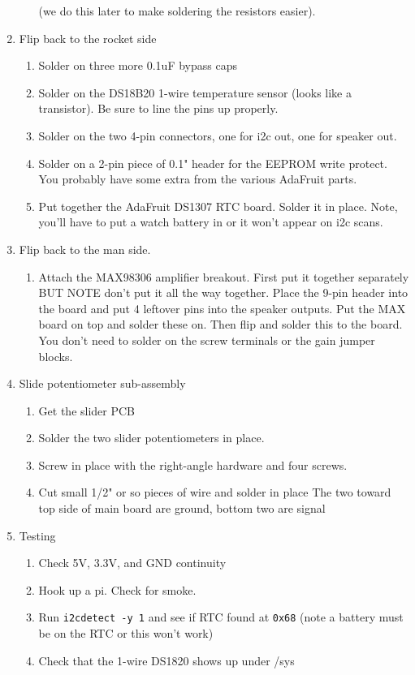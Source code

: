 \documentclass[11pt]{article}
\begin{document}
\begin{enumerate}
\begin{enumerate}
			(we do this later to make soldering the resistors easier).
	\end{enumerate}
\item	Flip back to the rocket side
	\begin{enumerate}
		\item Solder on three more 0.1uF bypass caps
		\item Solder on the DS18B20 1-wire temperature sensor (looks like
			a transistor).
                      Be sure to line the pins up properly.
		\item Solder on the two 4-pin connectors, one for i2c out, one for
			speaker out.
		\item Solder on a 2-pin piece of 0.1" header for the EEPROM write
			protect.
			You probably have some extra from the various AdaFruit parts.
		\item Put together the AdaFruit DS1307 RTC board.  Solder it in place.
			Note, you'll have to put a watch battery in or it won't appear
			on i2c scans.
	\end{enumerate}
\item Flip back to the man side.
	\begin{enumerate}
		\item Attach the MAX98306 amplifier breakout.
			First put it together separately BUT NOTE don't put it all the
			way together.
			Place the 9-pin header into the board and put 4 leftover pins
			into the speaker outputs.  Put the MAX board on top and solder these on.
			Then flip and solder this to the board.  You don't need to solder on
			the screw terminals or the gain jumper blocks.
	\end{enumerate}
	
\item Slide potentiometer sub-assembly
	\begin{enumerate}
		\item Get the slider PCB
		\item Solder the two slider potentiometers in place.
		\item Screw in place with the right-angle hardware and four screws.
		\item Cut small 1/2" or so pieces of wire and solder in place
			The two toward top side of main board are ground, 
			bottom two are signal
	\end{enumerate}

\item Testing
	\begin{enumerate}
		\item Check 5V, 3.3V, and GND continuity
		\item Hook up a pi.  Check for smoke.
		\item Run {\tt i2cdetect -y 1} and see if RTC found at {\tt 0x68}
			(note a battery must be on the RTC or this won't work)
		\item Check that the 1-wire DS1820 shows up under /sys
	\end{enumerate}
			

\end{enumerate}
\end{document}
